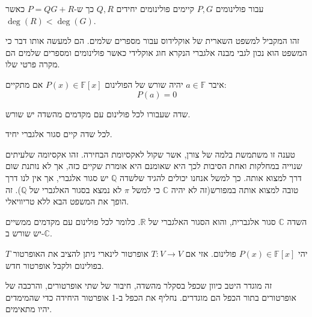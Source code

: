 \documentclass{tstextbook}
\begin{document}
\begin{theorem}[השארית]
עבור פולינומים \(P,G\) קיימים פולינומים יחידים \(Q,R\) כך ש-\(P=QG+R\) כאשר \(\deg(R)<\deg(G)\).

\end{theorem}
\begin{remark}
זהו המקביל למשפט השארית של אוקלידוס עבור מספרים שלמים. הם למעשה אותו דבר כי המשפט הוא נכון לגבי מבנה אלגברי הנקרא חוג אוקלידי כאשר פולינומים ומספרים שלמים הם מקרה פרטי שלו.

\end{remark}
\begin{definition}
איבר \(a \in \mathbb{F}\) יהיה שורש של הפולינום \(P(x) \in \mathbb{F} [x]\) אם מתקיים:
$$P(a)=0$$

\end{definition}
\begin{definition}
שדה שעבורו לכל פולינום עם מקדמים מהשדה יש שורש.

\end{definition}
\begin{proposition}
לכל שדה קיים סגור אלגברי יחיד.

\end{proposition}
\begin{remark}
טענה זו משתמשת בלמה של צורן, אשר שקול לאקסיומת הבחירה. זהו אקסיומה שלעיתים שנוייה במחלקות ואחת הסיבות לכך היא שאומנם היא אומרת שקיים כזה, אך לא נותנת שום דרך למצוא אותה. כך למשל אנחנו יכולים להגיד שלשדה \(\mathbb{Q}\) יש סגור אלגברי, אך אין לנו דרך טובה למצוא אותה במפורש(זה לא יהיה \(\mathbb{C}\) כי למשל \(\pi\) לא נמצא בסגור האלגברי של \(\mathbb{Q}\)). זה הופך את המשפט הבא ללא טריוויאלי.

\end{remark}
\begin{theorem}
השדה \(\mathbb{C}\) סגור אלגברית, והוא הסגור האלגברי של \(\mathbb{R}\). כלומר לכל פולינום עם מקדמים ממשיים יש שורש ב-\(\mathbb{C}\).

\end{theorem}
\begin{definition}
יהי \(P(x)\in \mathbb{F} [x]\) פולינום. אזי אם \(T:V\to V\) אופרטור לינארי ניתן להציב את האופרטור \(T\) בפולינום ולקבל אופרטור חדש.

\end{definition}
\begin{remark}
זה מוגדר היטב כיוון שכפל בסקלר מהשדה, חיבור של שתי אופרטורים, והרכבה של אופרטורים בתור הכפל הם מוגדרים. נחליף את הכפל ב-1 אופרטור היחידה כדי שהמימדים יהיו מתאימים.

\end{remark}
\end{document}
